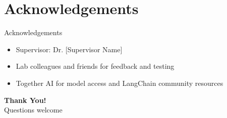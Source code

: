 \documentclass[aspectratio=169,xcolor=dvipsnames]{beamer}
\begin{document}
\section{Acknowledgements}

\begin{frame}{Acknowledgements}
    \begin{itemize}
        \item Supervisor: Dr. [Supervisor Name]
        \item Lab colleagues and friends for feedback and testing
        \item Together AI for model access and LangChain community resources
    \end{itemize}
    \vspace{0.4cm}
    \begin{center}
        {\Large \textbf{Thank You!}}\\
        \vspace{0.2cm}
        \small Questions welcome
    \end{center}
\end{frame}


\end{document}
